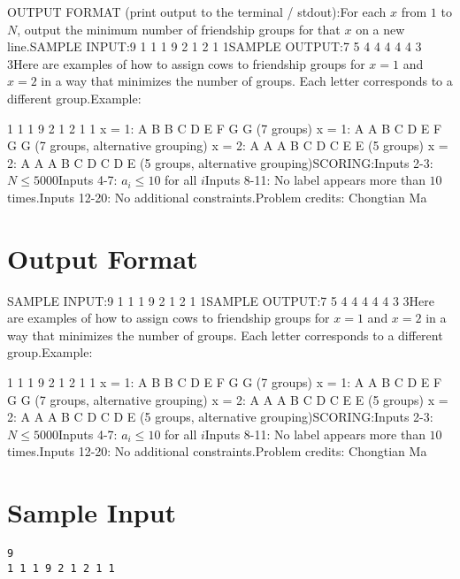 \documentclass[12pt]{article}
\begin{document}
OUTPUT FORMAT (print output to the terminal / stdout):For each $x$ from $1$ to $N$, output the minimum number of friendship groups for
that $x$ on a new line.SAMPLE INPUT:9
1 1 1 9 2 1 2 1 1SAMPLE OUTPUT:7
5
4
4
4
4
4
3
3Here are examples of how to assign cows to friendship groups for $x=1$ and $x=2$
in a way that minimizes the number of groups. Each letter corresponds to a
different group.Example:

       1 1 1 9 2 1 2 1 1
x = 1: A B B C D E F G G (7 groups)
x = 1: A A B C D E F G G (7 groups, alternative grouping)
x = 2: A A A B C D C E E (5 groups)
x = 2: A A A B C D C D E (5 groups, alternative grouping)SCORING:Inputs 2-3: $N\le 5000$Inputs 4-7: $a_i\le 10$ for all $i$Inputs 8-11: No label appears more than $10$ times.Inputs 12-20: No additional constraints.Problem credits: Chongtian Ma

\section*{Output Format}
SAMPLE INPUT:9
1 1 1 9 2 1 2 1 1SAMPLE OUTPUT:7
5
4
4
4
4
4
3
3Here are examples of how to assign cows to friendship groups for $x=1$ and $x=2$
in a way that minimizes the number of groups. Each letter corresponds to a
different group.Example:

       1 1 1 9 2 1 2 1 1
x = 1: A B B C D E F G G (7 groups)
x = 1: A A B C D E F G G (7 groups, alternative grouping)
x = 2: A A A B C D C E E (5 groups)
x = 2: A A A B C D C D E (5 groups, alternative grouping)SCORING:Inputs 2-3: $N\le 5000$Inputs 4-7: $a_i\le 10$ for all $i$Inputs 8-11: No label appears more than $10$ times.Inputs 12-20: No additional constraints.Problem credits: Chongtian Ma

\section*{Sample Input}
\begin{verbatim}
9
1 1 1 9 2 1 2 1 1
\end{verbatim}
\end{document}
